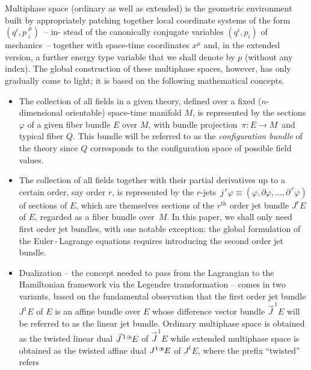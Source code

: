 \documentclass[a4paper,12pt,fleqn]{article}  %
\providecommand{\oast}{\ensuremath{\:\!%
 {\raisebox{0.1ex}{$\scriptscriptstyle \bigcirc$} \hspace{-0.5em} \ast}}}
\providecommand{\ostar}{\ensuremath{\:\!%
 {\raisebox{0.05ex}{$\scriptscriptstyle \bigcirc$} \hspace{-0.5em} \star}}}
\begin{document}
Multiphase space (ordinary as well as extended) is the geometric environment
built by appropriately patching together local coordinate systems of the form
$(q^i,p\>\!_i^\mu)$~-- in- \linebreak stead of the canonically conjugate
variables $(q^i,p_i)$ of mechanics~-- together with space-time coordinates
$x^\mu$ and, in the extended version, a further energy type variable that
we shall denote by $p$ (without any index). The global construction of
these multiphase spaces, however, has only gradually come to light; it
is based on the following mathematical concepts.
\begin{itemize}
 \item The collection of all fields in a given theory, defined over a fixed
       ($n$-dimensional orientable) space-time manifold $M$, is represented
       by the sections $\varphi$ of a given fiber bundle $E$ over $M$, with
       bundle projection $\, \pi : E \rightarrow M \,$ and typical fiber $Q$.
       This bundle will be referred to as the \emph{configuration bundle}
       of the theory since $Q$ corresponds to the configuration space of
       possible field values.
 \item The collection of all fields together with their partial derivatives
       up to a certain order, say order $r$, is represented by the $r$-jets
       $\, j^{\,r\!} \varphi \equiv (\varphi,\partial\varphi,\ldots,
       \partial^{\,r\!} \varphi)$  of sections of $E$, which are
       themselves sections of the $r^{\mathrm{th}}$ order jet bundle
       $J^r E$ of $E$, regarded as a fiber bundle over~$M$. In this paper,
       we shall only need first order jet bundles, \linebreak with one
       notable exception: the global formulation of the Euler\,-\,Lagrange
       equations requires introducing the second order jet bundle.
 \item Dualization -- the concept needed to pass from the Lagrangian to
       the Hamiltonian framework via the Legendre transformation -- comes
       in two variants, based on the fundamental observation that the first
       order jet bundle $J^1 E$ of $E$ is an affine bundle over $E$ whose
       difference vector bundle $\vec{J}^{\,1} E$ will be referred to as
       the linear jet bundle. Ordinary multiphase space is obtained as
       the twisted linear dual $\vec{J}^{\,1\oast} E$ of $\vec{J}^{\,1} E$
       while extended multiphase space is obtained as the twisted affine
       dual $J^{1\ostar} E$ of $J^1 E$, where the prefix ``twisted'' refers

\end{itemize}
\end{document}

